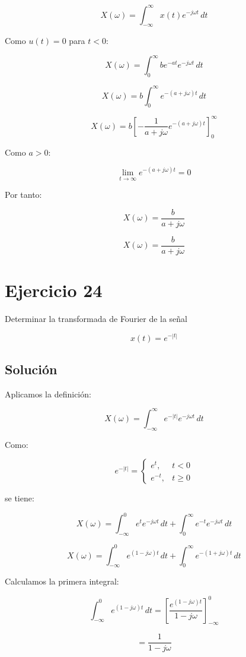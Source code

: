 \documentclass[fleqn]{article}
\begin{document}
	\[
	X(\omega)
	=
	\int_{-\infty}^{\infty}
	x(t)e^{-j\omega t}\,dt
	\]

	Como $u(t)=0$ para $t<0$:

	\[
	X(\omega)
	=
	\int_0^{\infty}
	be^{-at}e^{-j\omega t}\,dt
	\]

	\[
	X(\omega)
	=
	b
	\int_0^{\infty}
	e^{-(a+j\omega)t}\,dt
	\]

	\[
	X(\omega)
	=
	b
	\left[
	-\frac{1}{a+j\omega}
	e^{-(a+j\omega)t}
	\right]_0^{\infty}
	\]

	Como $a>0$:

	\[
	\lim_{t\to\infty}
	e^{-(a+j\omega)t}
	=
	0
	\]

	Por tanto:

	\[
	X(\omega)
	=
	\frac{b}{a+j\omega}
	\]

	\[
	\boxed{
	X(\omega)
	=
	\frac{b}{a+j\omega}
	}
	\]

\section{Ejercicio 24}
	Determinar la transformada de Fourier de la señal

	\[
	x(t)=e^{-|t|}
	\]

	\subsection{Solución}

	Aplicamos la definición:

	\[
	X(\omega)
	=
	\int_{-\infty}^{\infty}
	e^{-|t|}e^{-j\omega t}\,dt
	\]

	Como:

	\[
	e^{-|t|}
	=
	\begin{cases}
	e^t, & t<0 \\[1mm]
	e^{-t}, & t\geq0
	\end{cases}
	\]

	se tiene:

	\[
	X(\omega)
	=
	\int_{-\infty}^{0}
	e^te^{-j\omega t}\,dt
	+
	\int_{0}^{\infty}
	e^{-t}e^{-j\omega t}\,dt
	\]

	\[
	X(\omega)
	=
	\int_{-\infty}^{0}
	e^{(1-j\omega)t}\,dt
	+
	\int_{0}^{\infty}
	e^{-(1+j\omega)t}\,dt
	\]

	Calculamos la primera integral:

	\[
	\int_{-\infty}^{0}
	e^{(1-j\omega)t}\,dt
	=
	\left[
	\frac{e^{(1-j\omega)t}}{1-j\omega}
	\right]_{-\infty}^{0}
	\]

	\[
	=
	\frac{1}{1-j\omega}
	\]
\end{document}
